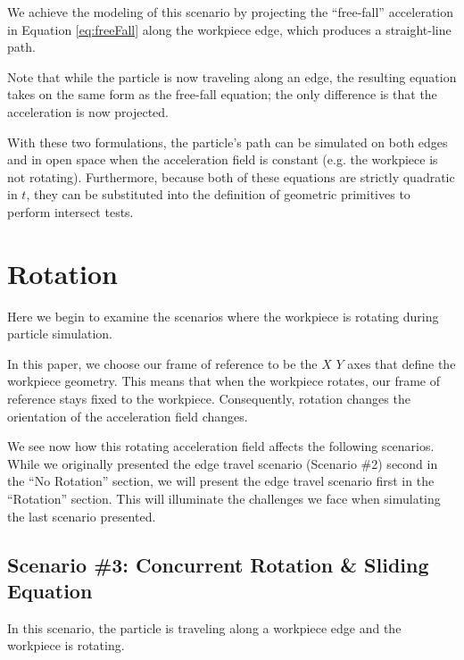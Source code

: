 We achieve the modeling of this scenario by projecting the ``free-fall'' acceleration in Equation \eqref{eq:freeFall} along the workpiece edge, which produces a straight-line path.

Note that while the particle is now traveling along an edge, the resulting equation takes on the same form as the free-fall equation; the only difference is that the acceleration is now projected.



With these two formulations, the particle's path can be simulated on both edges and in open space when the acceleration field is constant (e.g. the workpiece is not rotating). Furthermore, because both of these equations are strictly quadratic in $t$, they can be substituted into the definition of geometric primitives to perform intersect tests.

\section{Rotation}

Here we begin to examine the scenarios where the workpiece is rotating during particle simulation.

In this paper, we choose our frame of reference to be the $X$ $Y$ axes that define the workpiece geometry. This means that when the workpiece rotates, our frame of reference stays fixed to the workpiece. Consequently, rotation changes the orientation of the acceleration field changes.

We see now how this rotating acceleration field affects the following scenarios. While we originally presented the edge travel scenario (Scenario \#2) second in the ``No Rotation'' section, we will present the edge travel scenario first in the ``Rotation'' section. This will illuminate the challenges we face when simulating the last scenario presented.

		\subsection{Scenario \#3: Concurrent Rotation \& Sliding Equation}

In this scenario, the particle is traveling along a workpiece edge and the workpiece is rotating.

